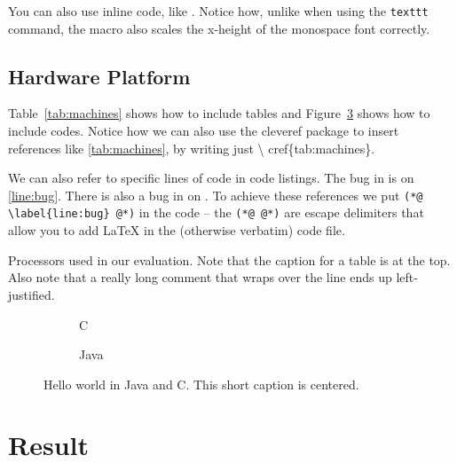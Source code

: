 You can also use inline code, like . Notice how, unlike when
using the \texttt{texttt} command, the  macro also scales the
x-height of the monospace font correctly.

\subsection{Hardware Platform}
\label{sec:hardplat}

Table~\ref{tab:machines} shows how to include tables and
Figure~\ref{fig:helloworld} shows how to include codes. Notice how we
can also use the \textsf{cleveref} package to insert references like
\cref{tab:machines}, by writing just \textbackslash
cref\{tab:machines\}.

We can also refer to specific lines of code in code listings. The bug
in  is on \cref{line:bug}. There is also a bug in
 on
. To achieve these
references we put \texttt{(*@ \textbackslash label\{line:bug\} @*)} in
the code -- the \texttt{(*@ @*)} are escape delimiters that allow you
to add LaTeX in the (otherwise verbatim) code file.

\begin{table*}
  \centering

  \caption{Processors used in our evaluation.  Note that the caption
    for a table is at the top.  Also note that a really long comment
    that wraps over the line ends up left-justified.}
  
  \label{tab:machines}
  
\end{table*}

\begin{figure}
  \centering
  \begin{subfigure}[b]{\textwidth}
      
      \caption{C}
      \label{fig:c:hello}
  \end{subfigure}

  \begin{subfigure}[b]{\textwidth}
      
      \caption{Java}
      \label{fig:java:hello}
  \end{subfigure}

  \caption{Hello world in Java and C. This short caption is centered.}
  \label{fig:helloworld}
\end{figure}
\section{Result}
\label{sec:Result}


